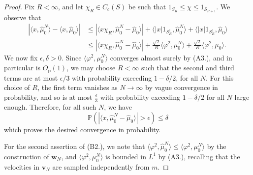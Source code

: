 \documentclass[11pt, notitlepage]{article}
\newcommand{\PP}{\ensuremath{\mathbb{P}}}
\newcommand{\abs}[1]{\left\lvert{#1}\right\rvert}
\begin{document}
\begin{proof}
Fix $R<\infty$, and let $\chi_R \in C_c(S)$ be such that $1_{S_R} \leq \chi \leq1_{S_{R+1}}$. We observe that
\begin{equation} \begin{split}
\abs{\langle x, \widehat{\mu}_0^N\rangle - \langle x, \widehat{\mu}_0\rangle}  &\leq
\abs{\langle x\chi_R, \widehat{\mu}_0^N-\widehat{\mu}_0\rangle } 
 +\langle \abs{x} 1_{S_R^\mathrm{c}},\widehat{\mu}_0^N\rangle
 +\langle \abs{x} 1_{S_R^\mathrm{c}},\widehat{\mu}_0\rangle \\[1ex]
 &\leq
 \abs{\langle x\chi_R, \widehat{\mu}_0^N-\widehat{\mu}_0\rangle} 
 +\frac{\sqrt{2}}{R}\langle \varphi^2,{\mu}_0^N\rangle
 +\frac{\sqrt{2}}{R}\langle \varphi^2,{\mu}_0\rangle.
\end{split} \end{equation}
We now fix $\epsilon, \delta>0$. Since $\langle \varphi^2,{\mu}_0^N\rangle$ converges almost surely by (A3.), and in particular is $O_\mathrm{p}(1)$, we may choose $R<\infty$ such that the second and third terms are at most $\epsilon/3$ with probability exceeding $1-\delta/2$, for all $N$. For this choice of $R$, the first term vanishes as $N\rightarrow\infty$ by vague convergence in probability, and so is at most $\frac{\epsilon}{3}$ with probability exceeding $1-\delta/2$ for all $N$ large enough. Therefore, for all such $N$, we have \begin{equation} \PP\left(|\langle x, \widehat{\mu}^N_0-\widehat{\mu}_0\rangle|>\epsilon\right)\le \delta \end{equation} which proves the desired convergence in probability.  

For the second assertion of (B2.), we note that $\langle \varphi^2, \widehat{\mu}^N_0\rangle \le \langle \varphi^2, \mu^N_0\rangle$ by the construction of $\mathbf{w}_N$, and $\langle \varphi^2, \mu^N_0\rangle$ is bounded in $L^1$ by (A3.), recalling that the velocities in $\mathbf{v}_N$ are sampled independently from $m$.
\end{proof}
\end{document}
